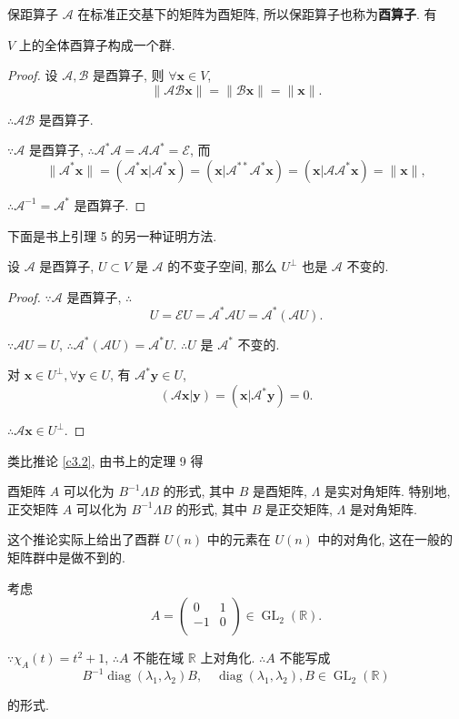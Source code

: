 \documentclass{ctexart}
\begin{document}
保距算子 $\mathcal{A}$ 在标准正交基下的矩阵为酉矩阵, 所以保距算子也称为\textbf{酉算子}. 有
\begin{theorem}
    $V$ 上的全体酉算子构成一个群.
\end{theorem}
\begin{proof}
    设 $\mathcal{A},\mathcal{B}$ 是酉算子, 则 $\forall\boldsymbol{x}\in V$,
    \[\|\mathcal{AB}\boldsymbol{x}\|=\|\mathcal{B}\boldsymbol{x}\|=\|\boldsymbol{x}\|.\]

    $\therefore\mathcal{AB}$ 是酉算子.

    $\because\mathcal{A}$ 是酉算子, $\therefore\mathcal{A}^*\mathcal{A}=\mathcal{A}\mathcal{A}^*=\mathcal{E}$, 而
    \[\|\mathcal{A}^*\boldsymbol{x}\|=(\mathcal{A}^*\boldsymbol{x}|\mathcal{A}^*\boldsymbol{x})=(\boldsymbol{x}|\mathcal{A}^{**}\mathcal{A}^*\boldsymbol{x})=(\boldsymbol{x}|\mathcal{A}\mathcal{A}^*\boldsymbol{x})=\|\boldsymbol{x}\|,\]
    
    $\therefore\mathcal{A}^{-1}=\mathcal{A}^*$ 是酉算子.
\end{proof}
下面是书上引理 5 的另一种证明方法.
\begin{lemma}[书上的引理 5]\label{l3.1}
    设 $\mathcal{A}$ 是酉算子, $U\subset V$ 是 $\mathcal{A}$ 的不变子空间, 那么 $U^\perp$ 也是 $\mathcal{A}$ 不变的.
\end{lemma}
\begin{proof}
    $\because\mathcal{A}$ 是酉算子, $\therefore$
    \[U=\mathcal{E}U=\mathcal{A}^*\mathcal{A}U=\mathcal{A}^*(\mathcal{A}U).\]

    $\because\mathcal{A}U=U$, $\therefore\mathcal{A}^*(\mathcal{A}U)=\mathcal{A}^*U$. $\therefore U$ 是 $\mathcal{A}^*$ 不变的.

    对 $\boldsymbol{x}\in U^\perp,\forall\boldsymbol{y}\in U$, 有 $\mathcal{A}^*\boldsymbol{y}\in U$,
    \[(\mathcal{A}\boldsymbol{x}|\boldsymbol{y})=(\boldsymbol{x}|\mathcal{A}^*\boldsymbol{y})=0.\]

    $\therefore\mathcal{A}\boldsymbol{x}\in U^\perp$.
\end{proof}
类比推论 \ref{c3.2}, 由书上的定理 9 得
\begin{corollary}\label{c3.3}
    酉矩阵 $A$ 可以化为 $B^{-1}\Lambda B$ 的形式, 其中 $B$ 是酉矩阵, $\Lambda$ 是实对角矩阵. 特别地, 正交矩阵 $A$ 可以化为 $B^{-1}\Lambda B$ 的形式, 其中 $B$ 是正交矩阵, $\Lambda$ 是对角矩阵.
\end{corollary}
这个推论实际上给出了酉群 $U(n)$ 中的元素在 $U(n)$ 中的对角化, 这在一般的矩阵群中是做不到的.
\begin{example}
    考虑
    \[A=\begin{pmatrix}
        0 & 1 \\
        -1 & 0 \\
    \end{pmatrix}\in\operatorname{GL}_2(\mathbb{R}).\]
    
    $\because\chi_A(t)=t^2+1$, $\therefore A$ 不能在域 $\mathbb{R}$ 上对角化. $\therefore A$ 不能写成
    \[B^{-1}\operatorname{diag}(\lambda_1,\lambda_2)B,\quad \operatorname{diag}(\lambda_1,\lambda_2),B\in\operatorname{GL}_2(\mathbb{R})\]

    的形式.
\end{example}
\end{document}
